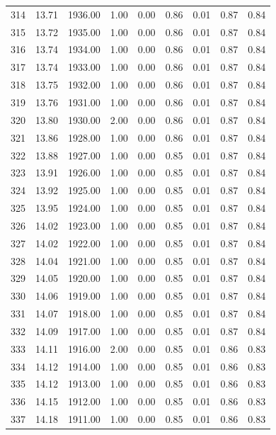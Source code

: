 \documentclass{article}\usepackage[]{graphicx}\usepackage[]{color}
\begin{document}
\begin{longtable}{rrrrrrrrr}
  314 & 13.71 & 1936.00 & 1.00 & 0.00 & 0.86 & 0.01 & 0.87 & 0.84 \\ 
  315 & 13.72 & 1935.00 & 1.00 & 0.00 & 0.86 & 0.01 & 0.87 & 0.84 \\ 
  316 & 13.74 & 1934.00 & 1.00 & 0.00 & 0.86 & 0.01 & 0.87 & 0.84 \\ 
  317 & 13.74 & 1933.00 & 1.00 & 0.00 & 0.86 & 0.01 & 0.87 & 0.84 \\ 
  318 & 13.75 & 1932.00 & 1.00 & 0.00 & 0.86 & 0.01 & 0.87 & 0.84 \\ 
  319 & 13.76 & 1931.00 & 1.00 & 0.00 & 0.86 & 0.01 & 0.87 & 0.84 \\ 
  320 & 13.80 & 1930.00 & 2.00 & 0.00 & 0.86 & 0.01 & 0.87 & 0.84 \\ 
  321 & 13.86 & 1928.00 & 1.00 & 0.00 & 0.86 & 0.01 & 0.87 & 0.84 \\ 
  322 & 13.88 & 1927.00 & 1.00 & 0.00 & 0.85 & 0.01 & 0.87 & 0.84 \\ 
  323 & 13.91 & 1926.00 & 1.00 & 0.00 & 0.85 & 0.01 & 0.87 & 0.84 \\ 
  324 & 13.92 & 1925.00 & 1.00 & 0.00 & 0.85 & 0.01 & 0.87 & 0.84 \\ 
  325 & 13.95 & 1924.00 & 1.00 & 0.00 & 0.85 & 0.01 & 0.87 & 0.84 \\ 
  326 & 14.02 & 1923.00 & 1.00 & 0.00 & 0.85 & 0.01 & 0.87 & 0.84 \\ 
  327 & 14.02 & 1922.00 & 1.00 & 0.00 & 0.85 & 0.01 & 0.87 & 0.84 \\ 
  328 & 14.04 & 1921.00 & 1.00 & 0.00 & 0.85 & 0.01 & 0.87 & 0.84 \\ 
  329 & 14.05 & 1920.00 & 1.00 & 0.00 & 0.85 & 0.01 & 0.87 & 0.84 \\ 
  330 & 14.06 & 1919.00 & 1.00 & 0.00 & 0.85 & 0.01 & 0.87 & 0.84 \\ 
  331 & 14.07 & 1918.00 & 1.00 & 0.00 & 0.85 & 0.01 & 0.87 & 0.84 \\ 
  332 & 14.09 & 1917.00 & 1.00 & 0.00 & 0.85 & 0.01 & 0.87 & 0.84 \\ 
  333 & 14.11 & 1916.00 & 2.00 & 0.00 & 0.85 & 0.01 & 0.86 & 0.83 \\ 
  334 & 14.12 & 1914.00 & 1.00 & 0.00 & 0.85 & 0.01 & 0.86 & 0.83 \\ 
  335 & 14.12 & 1913.00 & 1.00 & 0.00 & 0.85 & 0.01 & 0.86 & 0.83 \\ 
  336 & 14.15 & 1912.00 & 1.00 & 0.00 & 0.85 & 0.01 & 0.86 & 0.83 \\ 
  337 & 14.18 & 1911.00 & 1.00 & 0.00 & 0.85 & 0.01 & 0.86 & 0.83 \\ 

\end{longtable}
\end{document}
